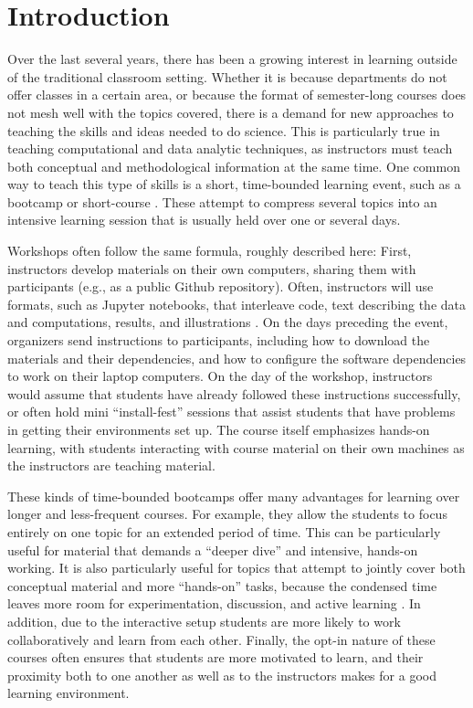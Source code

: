 \section{Introduction}

Over the last several years, there has been a growing interest in learning
outside of the traditional classroom setting. Whether it is because departments
do not offer classes in a certain area, or because the format of semester-long
courses does not mesh well with the topics covered, there is a demand for new
approaches to teaching the skills and ideas needed to do science. This is
particularly true in teaching computational and data analytic techniques,
as instructors must teach both conceptual and methodological information
at the same time. One common way to teach this type of skills is a short,
time-bounded learning event, such as a bootcamp or short-course
\cite{wilson2016software}. These attempt to compress several
topics into an intensive learning session that is usually held over one or
several days.

Workshops often follow the same formula, roughly described here: First,
instructors develop materials on their own computers, sharing them with
participants (e.g., as a public Github repository). Often, instructors will use
formats, such as Jupyter notebooks, that interleave code, text describing the
data and computations, results, and illustrations
\cite{kluyver2016jupyter}. On the days preceding the event, organizers send
instructions to participants, including how to download the materials and their
dependencies, and how to configure the software dependencies to work on their
laptop computers. On the day of the workshop, instructors would assume that
students have already followed these instructions successfully, or often hold
mini ``install-fest'' sessions that assist students that have problems in
getting their environments set up. The course itself emphasizes hands-on
learning, with students interacting with course material on their own
machines as the instructors are teaching material.

These kinds of time-bounded bootcamps offer many advantages for learning over
longer and less-frequent courses. For example, they allow the students to focus
entirely on one topic for an extended period of time. This can be particularly
useful for material that demands a ``deeper dive'' and intensive, hands-on
working. It is also particularly useful for topics that attempt to jointly
cover both conceptual material and more ``hands-on'' tasks, because the
condensed time leaves more room for experimentation, discussion, and active
learning \citep{Bransford2000-lu, Papert1980-fh}. In addition, due to the
interactive setup students are more likely to work collaboratively and learn
from each other. Finally, the opt-in nature of these
courses often ensures that students are more motivated to learn, and their
proximity both to one another as well as to the instructors makes for a good
learning environment.

